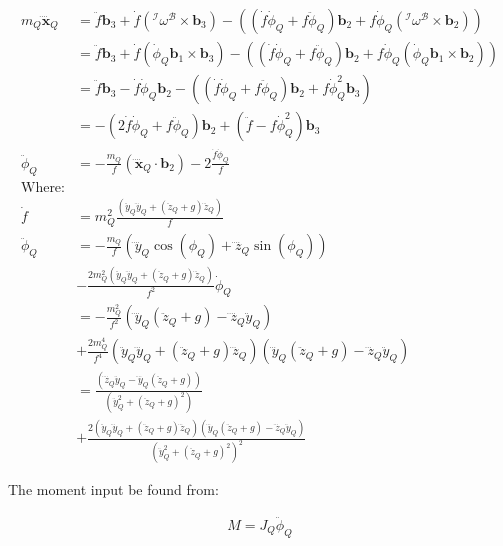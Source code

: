 \documentclass[11pt]{article}
\begin{document}
\begin{align*}
m_Q \mathbf{\ddddot{x}}_Q &= \ddot{f} \mathbf{b}_3 + \dot{f} \left( {}^{\mathcal{I}} \omega^{\mathcal{B}} \times \mathbf{b}_3 \right) - \left( (\dot{f} \dot{\phi}_Q  + f \ddot{\phi}_Q) \mathbf{b}_2 + f \dot{\phi}_Q ( {}^{\mathcal{I}} \omega^{\mathcal{B}} \times \mathbf{b}_2) \right) \\
&= \ddot{f} \mathbf{b}_3 + \dot{f} \left( \dot{\phi}_Q \mathbf{b}_1 \times \mathbf{b}_3 \right) - \left( (\dot{f} \dot{\phi}_Q  + f \ddot{\phi}_Q) \mathbf{b}_2 + f \dot{\phi}_Q ( \dot{\phi}_Q \mathbf{b}_1 \times \mathbf{b}_2) \right) \\
&= \ddot{f} \mathbf{b}_3 - \dot{f} \dot{\phi}_Q \mathbf{b}_2 - \left( (\dot{f} \dot{\phi}_Q  + f \ddot{\phi}_Q) \mathbf{b}_2 + f \dot{\phi}_Q^2 \mathbf{b}_3 \right) \\
&= - ( 2 \dot{f} \dot{\phi}_Q + f \ddot{\phi}_Q) \mathbf{b}_2 + ( \ddot{f} - f \dot{\phi}_Q^2 ) \mathbf{b}_3 \\
\ddot{\phi}_Q &= - \frac{m_Q}{f} (\mathbf{\ddddot{x}}_Q \cdot \mathbf{b}_2) - 2 \frac{ \dot{f} \dot{\phi}_Q } { f }  \\
\text{Where:} & \\
\dot{f} &= m_Q^2 \frac{ ( \ddot{y}_Q \dddot{y}_Q + (\ddot{z}_Q + g) \dddot{z}_Q ) } { f }  \\
\ddot{\phi}_Q &= - \frac{m_Q}{f} ( \ddddot{y}_Q \cos(\phi_Q) + \ddddot{z}_Q \sin(\phi_Q) ) \\ 
& - \frac{ 2 m_Q^2 ( \ddot{y}_Q \dddot{y}_Q + (\ddot{z}_Q + g) \dddot{z}_Q )  } { f^2 } \dot{\phi}_Q \\
&= - \frac{ m_Q^2 } {f^2} \left( \ddddot{y}_Q (\ddot{z}_Q + g) - \ddddot{z}_Q \ddot{y}_Q \right) \\
& + \frac{ 2 m_Q^4 } {f^4} ( \ddot{y}_Q \dddot{y}_Q + (\ddot{z}_Q + g) \dddot{z}_Q ) ( \dddot{y}_Q (\ddot{z}_Q + g) - \dddot{z}_Q \ddot{y}_Q ) \\
&= \frac{ \left(  \ddddot{z}_Q \ddot{y}_Q - \ddddot{y}_Q (\ddot{z}_Q + g) \right) }{ \left( \ddot{y}_Q^2 + (\ddot{z}_Q + g)^2 \right) } \\
& + \frac{ 2 ( \ddot{y}_Q \dddot{y}_Q + (\ddot{z}_Q + g) \dddot{z}_Q ) ( \dddot{y}_Q (\ddot{z}_Q + g) - \dddot{z}_Q \ddot{y}_Q ) } { \left( \ddot{y}_Q^2 + (\ddot{z}_Q + g)^2 \right)^2 }
\end{align*}

The moment input be found from:

\begin{align*}
M = J_Q \ddot{\phi}_Q
\end{align*}
\end{document}
